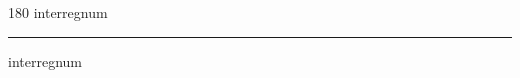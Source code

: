 
\begin{frame}
\begin{center}
\begin{turn}{180}
{\fontsize{2.5cm}{1em}\selectfont interregnum}
\end{turn}
\vspace{1em}\par  
\hrule
\vspace{1em}\par  
{\fontsize{2.5cm}{1em}\selectfont interregnum}
\end{center}
\end{frame}

